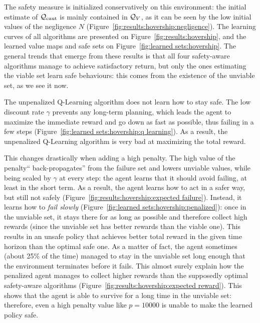 The safety measure is initialized conservatively on this environment: the initial estimate of $\mathcal{Q}_\text{caut}$ is mainly contained in $\mathcal{Q}_{V}$, as it can be seen by the low initial values of the negligence $N$ (Figure~\ref{fig:results:hovership:negligence}). The learning curves of all algorithms are presented on Figure~\ref{fig:results:hovership}, and the learned value maps and safe sets on Figure~\ref{fig:learned sets:hovership}. The general trends that emerge from these results is that all four safety-aware algorithms manage to achieve satisfactory return, but only the ones estimating the viable set learn safe behaviours: this comes from the existence of the unviable set, as we see it now.\par
The unpenalized Q-Learning algorithm does not learn how to stay safe. The low discount rate $\gamma$ prevents any long-term planning, which leads the agent to maximize the immediate reward and go down as fast as possible, thus failing in a few steps (Figure~\ref{fig:learned sets:hovership:q learning}). As a result, the unpenalized Q-Learning algorithm is very bad at maximizing the total reward. \par
This changes drastically when adding a high penalty. The high value of the penalty\enquote{ back-propagates} from the failure set and lowers unviable values, while being scaled by $\gamma$ at every step: the agent learns that it should avoid failing, at least in the short term. As a result, the agent learns how to act in a safer way, but still not safely (Figure~\ref{fig:results:hovership:expected failure}). Instead, it learns how to\emph{ fail slowly} (Figure~\ref{fig:learned sets:hovership:penalized}): once in the unviable set, it stays there for as long as possible and therefore collect high rewards (since the unviable set has better rewards than the viable one). This results in an unsafe policy that achieves better total reward in the given time horizon than the optimal safe one. As a matter of fact, the agent sometimes (about 25\% of the time) managed to stay in the unviable set long enough that the environment terminates before it fails. This almost surely explain how the penalized agent manages to collect higher rewards than the supposedly optimal safety-aware algorithms (Figure~\ref{fig:results:hovership:expected reward}). This shows that the agent is able to survive for a long time in the unviable set: therefore, even a high penalty value like $p=10000$ is unable to make the learned policy safe.\par
